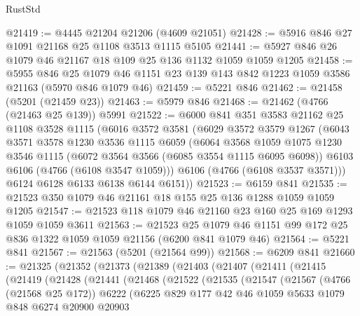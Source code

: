 \begin{lexlean}{RustStd}
\begin{coremodule}
@21419 := @4445 @21204 @21206 (@4609 @21051)
@21428 := @5916 @846 @27 @1091 @21168 @25 @1108 @3513 @1115 @5105
@21441 := @5927 @846 @26 @1079 @46 @21167 @18 @109 @25 @136 @1132 @1059 @1059 @1205
@21458 := @5955
    @846
    @25
    @1079
    @46
    @1151
    @23
    @139
    @143
    @842
    @1223
    @1059
    @3586
    @21163
    (@5970 @846 @1079 @46)
@21459 := @5221 @846
@21462 := @21458 (@5201 (@21459 @23))
@21463 := @5979 @846
@21468 := @21462 (@4766 (@21463 @25 @139)) @5991
@21522 := @6000
    @841
    @351
    @3583
    @21162
    @25
    @1108
    @3528
    @1115
    (@6016
      @3572
      @3581
      (@6029
        @3572
        @3579
        @1267
        (@6043
          @3571
          @3578
          @1230
          @3536
          @1115
          @6059
          (@6064
            @3568
            @1059
            @1075
            @1230
            @3546
            @1115
            (@6072 @3564 @3566 (@6085 @3554 @1115 @6095 @6098))
            @6103
            @6106
            (@4766 (@6108 @3547 @1059)))
          @6106
          (@4766 (@6108 @3537 @3571)))
        @6124
        @6128
        @6133
        @6138
        @6144
        @6151))
@21523 := @6159 @841
@21535 := @21523 @350 @1079 @46 @21161 @18 @155 @25 @136 @1288 @1059 @1059 @1205
@21547 := @21523 @118 @1079 @46 @21160 @23 @160 @25 @169 @1293 @1059 @1059 @3611
@21563 := @21523
    @25
    @1079
    @46
    @1151
    @99
    @172
    @25
    @836
    @1322
    @1059
    @1059
    @21156
    (@6200 @841 @1079 @46)
@21564 := @5221 @841
@21567 := @21563 (@5201 (@21564 @99))
@21568 := @6209 @841
@21660 := @21325
    (@21352
      (@21373
        (@21389
          (@21403
            (@21407
              (@21411
                (@21415
                  (@21419
                    (@21428
                      (@21441
                        (@21468
                          (@21522
                            (@21535
                              (@21547
                                (@21567
                                  (@4766 (@21568 @25 @172))
                                  @6222
                                  (@6225
                                    @829
                                    @177
                                    @42
                                    @46
                                    @1059
                                    @5633
                                    @1079
                                    @848
                                    @6274
                                    @20900
                                    @20903

\end{coremodule}
\end{lexlean}
